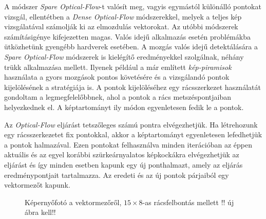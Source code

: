 A módszer \textit{Spare Optical-Flow}-t valósít meg, vagyis egymástól különálló pontokat vizsgál, ellentétben a \textit{Dense Optical-Flow} módszerekkel, melyek a teljes kép vizsgálatával számolják ki az elmozdulás vektorokat. \cite{bradski2008learning} Az utóbbi módszerek számításigénye kifejezetten magas. Valós idejű alkalmazás esetén problémákba ütközhetünk gyengébb hardverek esetében. A mozgás valós idejű detektálására a \textit{Spare Optical-Flow} módszerek is kielégítő eredményekkel szolgálnak, néhány trükk alkalmazása mellett. Ilyenek például a már említett \textit{kép-piramisok} használata a gyors mozgások pontos követésére és a vizsgálandó pontok kijelölésének a stratégiája is. A pontok kijelöléséhez egy rácsszerkezet használatát gondoltam a legmegfelelőbbnek, ahol a pontok a rács metszéspontjaiban helyezkednek el. A képtartományt ily módon egyenletesen fedik le a pontok.


Az \textit{Optical-Flow} eljárást tetszőleges számú pontra elvégezhetjük. Ha létrehozunk egy rácsszerkezetet fix pontokkal, akkor a képtartományt egyenletesen lefedhetjük a pontok halmazával.
Ezen pontokat felhasználva minden iterációban az éppen aktuális és az egyel korábbi szürkeárnyalatos képkockákra elvégezhetjük az eljárást és így minden esetben kapunk egy új ponthalmazt, amely az eljárás eredménypontjait tartalmazza. Az eredeti és az új pontok párjaiból egy vektormezőt kapunk.

\begin{figure}[h]
\centering
{}
\caption{Képernyőfotó a vektormezőről, $15 \times 8$-as rácsfelbontás mellett !! új ábra kell!! }
\label{fig:vectorfield}
\end{figure}

